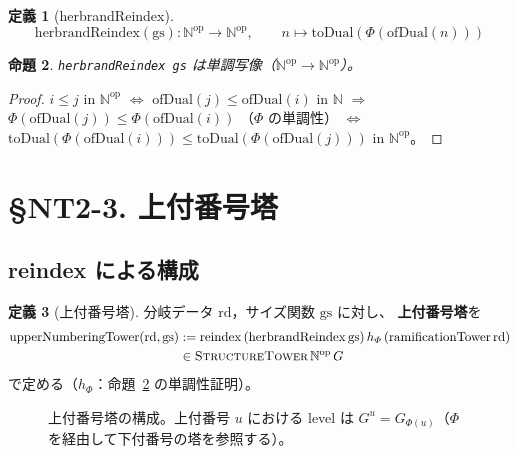 \documentclass[a4paper,11pt]{ltjsarticle}
\theoremstyle{definition}
\newtheorem{definition}{定義}[section]
\theoremstyle{plain}
\newtheorem{proposition}[definition]{命題}
\theoremstyle{remark}
\newcommand{\Phi}{\varPhi}
\begin{document}
\begin{definition}[herbrandReindex]\label{def:herbrand-reindex}
  \[
    \mathrm{herbrandReindex}(\mathrm{gs})\colon \mathbb{N}^{\mathrm{op}} \to \mathbb{N}^{\mathrm{op}},
    \qquad n \mapsto \mathrm{toDual}(\Phi(\mathrm{ofDual}(n)))
  \]
\end{definition}

\begin{proposition}\label{prop:herbrand-reindex-mono}
  \texttt{herbrandReindex gs} は単調写像（$\mathbb{N}^{\mathrm{op}} \to \mathbb{N}^{\mathrm{op}}$）。
\end{proposition}

\begin{proof}
  $i \leq j$ in $\mathbb{N}^{\mathrm{op}}$ $\Leftrightarrow$ $\mathrm{ofDual}(j) \leq \mathrm{ofDual}(i)$ in $\mathbb{N}$
  $\Rightarrow$ $\Phi(\mathrm{ofDual}(j)) \leq \Phi(\mathrm{ofDual}(i))$ （$\Phi$ の単調性）
  $\Leftrightarrow$ $\mathrm{toDual}(\Phi(\mathrm{ofDual}(i))) \leq \mathrm{toDual}(\Phi(\mathrm{ofDual}(j)))$
  in $\mathbb{N}^{\mathrm{op}}$。
\end{proof}

\section{\S NT2-3. 上付番号塔}

\subsection{reindex による構成}

\begin{definition}[上付番号塔]\label{def:upper-numbering-tower}
  分岐データ $\mathrm{rd}$，サイズ関数 $\mathrm{gs}$ に対し、
  \textbf{上付番号塔}を
  \begin{align*}
    \mathrm{upperNumberingTower}(\mathrm{rd},\mathrm{gs})
    &:= \mathrm{reindex}\,(\mathrm{herbrandReindex}\,\mathrm{gs})\,
       h_\Phi\,(\mathrm{ramificationTower}\,\mathrm{rd}) \\
    &\in \textsc{StructureTower}\,\mathbb{N}^{\mathrm{op}}\,G
  \end{align*}
  で定める（$h_\Phi$：命題~\ref{prop:herbrand-reindex-mono} の単調性証明）。
\end{definition}

\begin{figure}[H]
\centering
{}
\caption{上付番号塔の構成。上付番号 $u$ における level は
$G^u = G_{\Phi(u)}$（$\Phi$ を経由して下付番号の塔を参照する）。}
\label{fig:upper-numbering-tower}
\end{figure}
\end{document}
